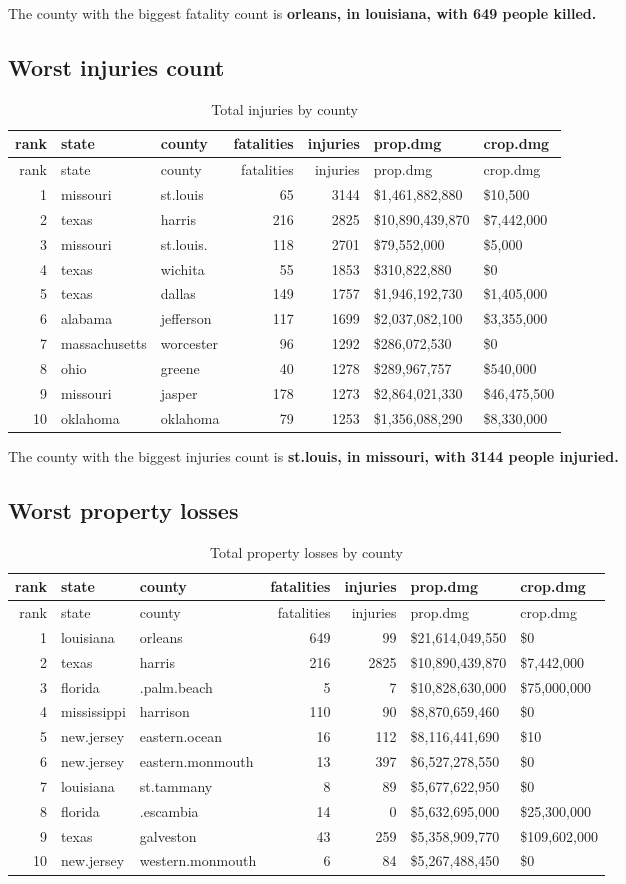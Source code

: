 \documentclass[]{article}
\begin{document}
The county with the biggest fatality count is \textbf{orleans, in
louisiana, with 649 people killed.}

\subsection{Worst injuries count}\label{worst-injuries-count}

\begin{longtable}[]{@{}rllrrll@{}}
\caption{Total injuries by county}\tabularnewline
\toprule
rank & state & county & fatalities & injuries & prop.dmg &
crop.dmg\tabularnewline
\midrule
\endfirsthead
\toprule
rank & state & county & fatalities & injuries & prop.dmg &
crop.dmg\tabularnewline
\midrule
\endhead
1 & missouri & st.louis & 65 & 3144 & \$1,461,882,880 &
\$10,500\tabularnewline
2 & texas & harris & 216 & 2825 & \$10,890,439,870 &
\$7,442,000\tabularnewline
3 & missouri & st.louis. & 118 & 2701 & \$79,552,000 &
\$5,000\tabularnewline
4 & texas & wichita & 55 & 1853 & \$310,822,880 & \$0\tabularnewline
5 & texas & dallas & 149 & 1757 & \$1,946,192,730 &
\$1,405,000\tabularnewline
6 & alabama & jefferson & 117 & 1699 & \$2,037,082,100 &
\$3,355,000\tabularnewline
7 & massachusetts & worcester & 96 & 1292 & \$286,072,530 &
\$0\tabularnewline
8 & ohio & greene & 40 & 1278 & \$289,967,757 & \$540,000\tabularnewline
9 & missouri & jasper & 178 & 1273 & \$2,864,021,330 &
\$46,475,500\tabularnewline
10 & oklahoma & oklahoma & 79 & 1253 & \$1,356,088,290 &
\$8,330,000\tabularnewline
\bottomrule
\end{longtable}

The county with the biggest injuries count is \textbf{st.louis, in
missouri, with 3144 people injuried.}

\subsection{Worst property losses}\label{worst-property-losses}

\begin{longtable}[]{@{}rllrrll@{}}
\caption{Total property losses by county}\tabularnewline
\toprule
rank & state & county & fatalities & injuries & prop.dmg &
crop.dmg\tabularnewline
\midrule
\endfirsthead
\toprule
rank & state & county & fatalities & injuries & prop.dmg &
crop.dmg\tabularnewline
\midrule
\endhead
1 & louisiana & orleans & 649 & 99 & \$21,614,049,550 &
\$0\tabularnewline
2 & texas & harris & 216 & 2825 & \$10,890,439,870 &
\$7,442,000\tabularnewline
3 & florida & .palm.beach & 5 & 7 & \$10,828,630,000 &
\$75,000,000\tabularnewline
4 & mississippi & harrison & 110 & 90 & \$8,870,659,460 &
\$0\tabularnewline
5 & new.jersey & eastern.ocean & 16 & 112 & \$8,116,441,690 &
\$10\tabularnewline
6 & new.jersey & eastern.monmouth & 13 & 397 & \$6,527,278,550 &
\$0\tabularnewline
7 & louisiana & st.tammany & 8 & 89 & \$5,677,622,950 &
\$0\tabularnewline
8 & florida & .escambia & 14 & 0 & \$5,632,695,000 &
\$25,300,000\tabularnewline
9 & texas & galveston & 43 & 259 & \$5,358,909,770 &
\$109,602,000\tabularnewline
10 & new.jersey & western.monmouth & 6 & 84 & \$5,267,488,450 &
\$0\tabularnewline
\bottomrule
\end{longtable}
\end{document}
